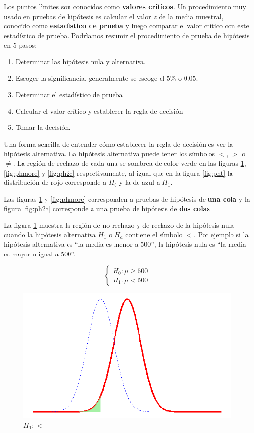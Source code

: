 \documentclass[letterpaper,]{book}
\providecommand{\tightlist}{%
  \setlength{\itemsep}{0pt}\setlength{\parskip}{0pt}}
\begin{document}
Los puntos lìmites son conocidos como \textbf{valores críticos}. Un procedimiento muy usado en pruebas de hipótesis es calcular el valor \(z\) de la media muestral, conocido como \textbf{estadìstico de prueba} y luego comparar el valor crìtico con este estadístico de prueba. Podrìamos resumir el procedimiento de prueba de hipótesis en 5 pasos:

\begin{enumerate}
\def\labelenumi{\arabic{enumi}.}
\tightlist
\item
  Determinar las hipótesis nula y alternativa.
\item
  Escoger la significancia, generalmente se escoge el \(5\%\) o \(0.05\).
\item
  Determinar el estadístico de prueba
\item
  Calcular el valor crítico y establecer la regla de decisión
\item
  Tomar la decisión.
\end{enumerate}

Una forma sencilla de entender cómo establecer la regla de decisión es ver la hipótesis alternativa. La hipótesis alternativa puede tener los símbolos \(<\), \(>\) o \(\neq\). La región de rechazo de cada una se sombrea de color verde en las figuras \ref{fig:phless}, \ref{fig:phmore} y \ref{fig:ph2c} respectivamente, al igual que en la figura \ref{fig:pht} la distribución de rojo corresponde a \(H_0\) y la de azul a \(H_1\).

Las figuras \ref{fig:phless} y \ref{fig:phmore} corresponden a pruebas de hipótesis de \textbf{una cola} y la figura \ref{fig:ph2c} corresponde a una prueba de hipótesis de \textbf{dos colas}

La figura \ref{fig:phless} muestra la región de no rechazo y de rechazo de la hipótesis nula cuando la hipótesis alternativa \(H_1\) o \(H_a\) contiene el símbolo \(<\). Por ejemplo si la hipótesis alternativa es ``la media es menor a 500'', la hipótesis nula es ``la media es mayor o igual a 500''.

\begin{equation} 
\begin{cases} 
H_0: \mu \geq 500 \\ 
H_1: \mu < 500
\end{cases} 
\end{equation}

\begin{figure}[!h]

{\centering \includegraphics[width=0.6\linewidth]{phless} 

}

\caption{$H_1:<$}\label{fig:phless}
\end{figure}
\end{document}
